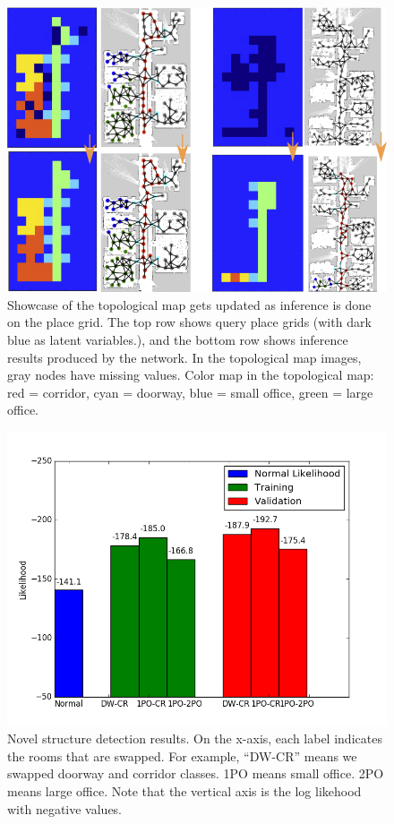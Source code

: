 \documentclass[10pt, titlepage]{article}
\theoremstyle{definition}
\begin{document}
\begin{figure}[!htb]
    \centering
    \captionsetup{width=.8\linewidth}
    \includegraphics[scale=0.7]{images/placegri_graph_illustration.png}
    \caption{Showcase of the topological map gets updated as inference is done on the place grid. The top row shows query place grids (with dark blue as latent variables.), and the bottom row shows inference results produced by the network. In the topological map images, gray nodes have missing values. Color map in the topological map: red = corridor, cyan = doorway, blue = small office, green = large office.}
    \label{fig:pg_graph}
\end{figure}


\begin{figure}[!htb]
    \centering
    \captionsetup{width=.8\linewidth}
    \includegraphics[scale=0.4]{images/novelty.png}
    \caption{Novel structure detection results. On the x-axis, each label indicates the rooms that are swapped. For example, ``DW-CR'' means we swapped doorway and corridor classes. 1PO means small office. 2PO means large office. Note that the vertical axis is the log likehood with negative values.}
    \label{fig:novelty}
\end{figure}
\end{document}
